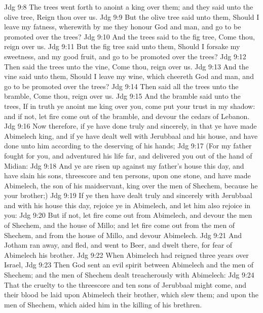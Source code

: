 \vs Jdg 9:8 The trees went forth  to anoint a king over them; and they said unto the olive tree, Reign thou over us.
\vs Jdg 9:9 But the olive tree said unto them, Should I leave my fatness, wherewith by me they honour God and man, and go to be promoted over the trees?
\vs Jdg 9:10 And the trees said to the fig tree, Come thou,  reign over us.
\vs Jdg 9:11 But the fig tree said unto them, Should I forsake my sweetness, and my good fruit, and go to be promoted over the trees?
\vs Jdg 9:12 Then said the trees unto the vine, Come thou,  reign over us.
\vs Jdg 9:13 And the vine said unto them, Should I leave my wine, which cheereth God and man, and go to be promoted over the trees?
\vs Jdg 9:14 Then said all the trees unto the bramble, Come thou,  reign over us.
\vs Jdg 9:15 And the bramble said unto the trees, If in truth ye anoint me king over you,  come  put your trust in my shadow: and if not, let fire come out of the bramble, and devour the cedars of Lebanon.
\vs Jdg 9:16 Now therefore, if ye have done truly and sincerely, in that ye have made Abimelech king, and if ye have dealt well with Jerubbaal and his house, and have done unto him according to the deserving of his hands;
\vs Jdg 9:17 (For my father fought for you, and adventured his life far, and delivered you out of the hand of Midian:
\vs Jdg 9:18 And ye are risen up against my father's house this day, and have slain his sons, threescore and ten persons, upon one stone, and have made Abimelech, the son of his maidservant, king over the men of Shechem, because he  your brother;)
\vs Jdg 9:19 If ye then have dealt truly and sincerely with Jerubbaal and with his house this day,  rejoice ye in Abimelech, and let him also rejoice in you:
\vs Jdg 9:20 But if not, let fire come out from Abimelech, and devour the men of Shechem, and the house of Millo; and let fire come out from the men of Shechem, and from the house of Millo, and devour Abimelech.
\vs Jdg 9:21 And Jotham ran away, and fled, and went to Beer, and dwelt there, for fear of Abimelech his brother.
\vs Jdg 9:22 When Abimelech had reigned three years over Israel,
\vs Jdg 9:23 Then God sent an evil spirit between Abimelech and the men of Shechem; and the men of Shechem dealt treacherously with Abimelech:
\vs Jdg 9:24 That the cruelty  to the threescore and ten sons of Jerubbaal might come, and their blood be laid upon Abimelech their brother, which slew them; and upon the men of Shechem, which aided him in the killing of his brethren.
